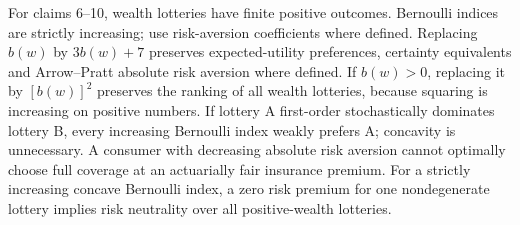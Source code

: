 \clearpage
For claims 6--10, wealth lotteries have finite positive outcomes. Bernoulli
indices are strictly increasing; use risk-aversion coefficients where defined.
Replacing $b(w)$ by $3b(w)+7$ preserves expected-utility preferences,
certainty equivalents and Arrow--Pratt absolute risk aversion where defined.
If $b(w)>0$, replacing it by $[b(w)]^2$ preserves the ranking of all wealth
lotteries, because squaring is increasing on positive numbers.
If lottery A first-order stochastically dominates lottery B, every increasing
Bernoulli index weakly prefers A; concavity is unnecessary.
A consumer with decreasing absolute risk aversion cannot optimally choose
full coverage at an actuarially fair insurance premium.
For a strictly increasing concave Bernoulli index, a zero risk premium for one
nondegenerate lottery implies risk neutrality over all positive-wealth lotteries.
